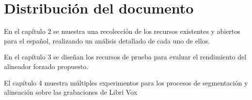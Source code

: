 \section{Distribución del documento}

En el capítulo 2 se muestra una recolección de los recursos existentes y abiertos para el español, realizando un análisis detallado de cada uno de ellos.

En el capítulo 3 se diseñan los recursos de prueba para evaluar el rendimiento del alineador forzado propuesto.

El capítulo 4 muestra múltiples experimentos para los procesos de segmentación y alineación sobre las grabaciones de Libri Vox